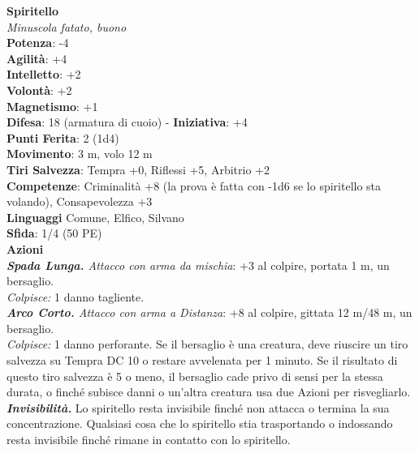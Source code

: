 \begin{multicols}{2}
\medskip\textbf{Spiritello}\\
\emph{Minuscola fatato, buono}\\
\textbf{Potenza}: -4\\
\textbf{Agilità}: +4\\
\textbf{Intelletto}: +2\\
\textbf{Volontà}: +2\\
\textbf{Magnetismo}: +1\\
\textbf{Difesa}: 18 (armatura di cuoio) - \textbf{Iniziativa}: +4\\
\textbf{Punti Ferita}: 2 (1d4)\\
\textbf{Movimento}: 3 m, volo 12 m\\
\textbf{Tiri Salvezza}: Tempra +0, Riflessi +5, Arbitrio +2\\
\textbf{Competenze}: Criminalità +8 (la prova è fatta con -1d6 se lo spiritello sta volando), Consapevolezza +3\\
\textbf{Linguaggi} Comune, Elfico, Silvano\\
\textbf{Sfida}: 1/4 (50 PE)\smallskip\\
\smallskip\textbf{Azioni}\\
\emph{\textbf{Spada Lunga.} Attacco con arma da mischia}: +3 al colpire, portata 1 m, un bersaglio.\\
\emph{Colpisce:} 1 danno tagliente.\\
\emph{\textbf{Arco Corto.} Attacco con arma a Distanza}: +8 al colpire, gittata 12 m/48 m, un bersaglio.\\

\emph{Colpisce:} 1 danno perforante. Se il bersaglio è una creatura, deve riuscire un tiro salvezza su Tempra DC 10 o restare avvelenata per 1 minuto. Se il risultato di questo tiro salvezza è 5 o meno, il bersaglio cade privo di sensi per la stessa durata, o finché subisce danni o un'altra creatura usa due Azioni per risvegliarlo.\\

\emph{\textbf{Invisibilità.}} Lo spiritello resta invisibile finché non attacca o termina la sua concentrazione. Qualsiasi cosa che lo spiritello stia trasportando o indossando resta invisibile finché rimane in contatto con lo spiritello.\\


\end{multicols}
